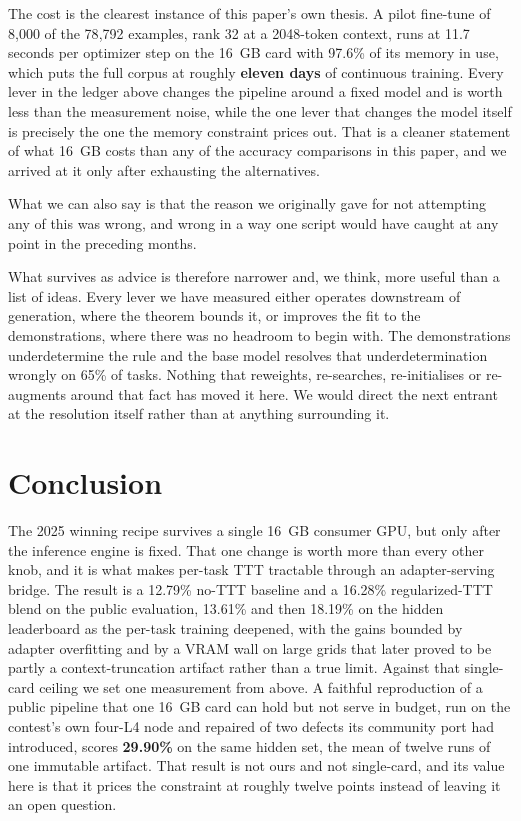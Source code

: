 \documentclass[11pt]{article}
\begin{document}
The cost is the clearest instance of this paper's own
thesis. A pilot fine-tune of 8{,}000 of the 78{,}792 examples, rank 32 at a 2048-token context, runs
at 11.7 seconds per optimizer step on the 16~GB card with 97.6\% of its memory in use, which puts the
full corpus at roughly \textbf{eleven days} of continuous training. Every lever in the ledger above
changes the pipeline around a fixed model and is worth less than the measurement noise, while the one lever
that changes the model itself is precisely the one the memory constraint prices out. That is a
cleaner statement of what 16~GB costs than any of the accuracy comparisons in this paper, and we
arrived at it only after exhausting the alternatives.

What we can also say is that the reason we originally gave for not attempting any of this was wrong,
and wrong in a way one script would have caught at any point in the preceding months.

What survives as advice is therefore narrower and, we think, more useful than a list of ideas. Every
lever we have measured either operates downstream of generation, where the theorem bounds it, or
improves the fit to the demonstrations, where there was no headroom to begin with. The demonstrations
underdetermine the rule and the base model resolves that underdetermination wrongly on 65\% of tasks.
Nothing that reweights, re-searches, re-initialises or re-augments around that fact has moved it
here. We would direct the next entrant at the resolution itself rather than at anything surrounding
it.

\section{Conclusion}
\label{sec:conclusion}
The 2025 winning recipe survives a single 16~GB consumer GPU, but only after the inference engine is
fixed. That one change is worth more than every other knob, and it is what makes per-task TTT
tractable through an adapter-serving bridge. The result is a 12.79\% no-TTT baseline and a
16.28\% regularized-TTT blend on the public evaluation, 13.61\% and then 18.19\% on the hidden leaderboard as the per-task training deepened, with the
gains bounded by adapter overfitting and by a VRAM wall on large grids that later proved to be partly a
context-truncation artifact rather than a true limit. Against that single-card ceiling we set one
measurement from above. A faithful reproduction of a public pipeline that one 16~GB card can hold but not
serve in budget, run on the contest's own four-L4 node and repaired of two defects its community port had
introduced, scores \textbf{29.90\%} on the same hidden set, the mean of twelve runs of one immutable
artifact. That result is not ours and not single-card, and its value here is that it prices the
constraint at roughly twelve points instead of leaving it an open question.
\end{document}
